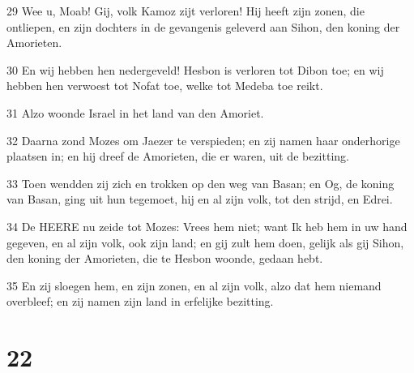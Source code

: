 \par 29 Wee u, Moab! Gij, volk Kamoz zijt verloren! Hij heeft zijn zonen, die ontliepen, en zijn dochters in de gevangenis geleverd aan Sihon, den koning der Amorieten.
\par 30 En wij hebben hen nedergeveld! Hesbon is verloren tot Dibon toe; en wij hebben hen verwoest tot Nofat toe, welke tot Medeba toe reikt.
\par 31 Alzo woonde Israel in het land van den Amoriet.
\par 32 Daarna zond Mozes om Jaezer te verspieden; en zij namen haar onderhorige plaatsen in; en hij dreef de Amorieten, die er waren, uit de bezitting.
\par 33 Toen wendden zij zich en trokken op den weg van Basan; en Og, de koning van Basan, ging uit hun tegemoet, hij en al zijn volk, tot den strijd, en Edrei.
\par 34 De HEERE nu zeide tot Mozes: Vrees hem niet; want Ik heb hem in uw hand gegeven, en al zijn volk, ook zijn land; en gij zult hem doen, gelijk als gij Sihon, den koning der Amorieten, die te Hesbon woonde, gedaan hebt.
\par 35 En zij sloegen hem, en zijn zonen, en al zijn volk, alzo dat hem niemand overbleef; en zij namen zijn land in erfelijke bezitting.

\chapter{22}

